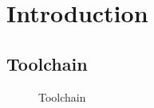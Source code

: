 \section{Introduction}

\subsection{Toolchain}

\begin{figure}[h]
  \centering
  
  \caption{Toolchain}
\end{figure}
